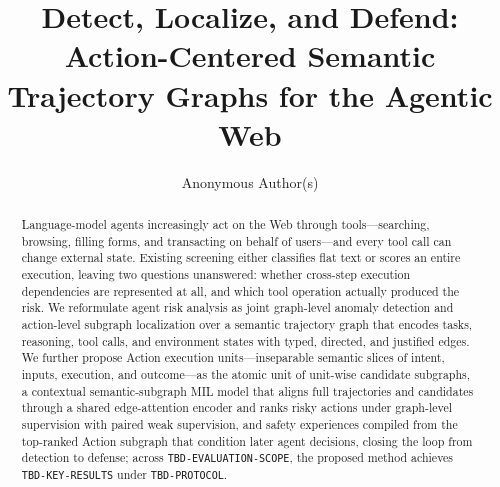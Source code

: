 \documentclass[sigconf,anonymous]{acmart}
\newcommand{\tbd}[1]{\textcolor{tbdred}{\texttt{#1}}}
\newcommand{\stg}{semantic trajectory graph}
\newcommand{\aeu}{Action execution unit}
\newcommand{\csg}{candidate subgraph}
\newcommand{\csmil}{contextual semantic-subgraph MIL}
\newcommand{\sexp}{safety experience}
\begin{document}
\title{Detect, Localize, and Defend: Action-Centered Semantic Trajectory Graphs for the Agentic Web}

\author{Anonymous Author(s)}

\begin{abstract}
Language-model agents increasingly act on the Web through tools---searching, browsing, filling forms, and transacting on behalf of users---and every tool call can change external state. Existing screening either classifies flat text or scores an entire execution, leaving two questions unanswered: whether cross-step execution dependencies are represented at all, and which tool operation actually produced the risk. We reformulate agent risk analysis as joint graph-level anomaly detection and action-level subgraph localization over a \stg{} that encodes tasks, reasoning, tool calls, and environment states with typed, directed, and justified edges. We further propose \aeu{}s---inseparable semantic slices of intent, inputs, execution, and outcome---as the atomic unit of unit-wise \csg{}s, a \csmil{} model that aligns full trajectories and candidates through a shared edge-attention encoder and ranks risky actions under graph-level supervision with paired weak supervision, and \sexp{}s compiled from the top-ranked Action subgraph that condition later agent decisions, closing the loop from detection to defense; across \tbd{TBD-EVALUATION-SCOPE}, the proposed method achieves \tbd{TBD-KEY-RESULTS} under \tbd{TBD-PROTOCOL}.
\end{abstract}

\maketitle













\end{document}
